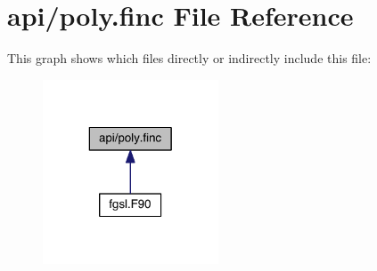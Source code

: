 \hypertarget{poly_8finc}{\section{api/poly.finc File Reference}
\label{poly_8finc}
}
This graph shows which files directly or indirectly include this file\-:\nopagebreak
\begin{figure}[H]
\begin{center}
\leavevmode
\includegraphics[width=148pt]{poly_8finc__dep__incl}
\end{center}
\end{figure}
